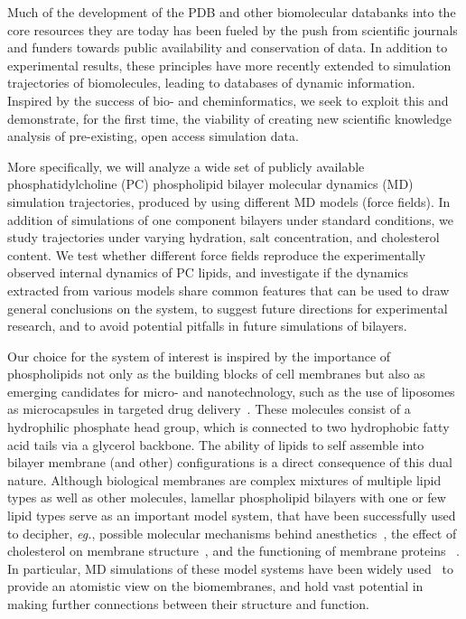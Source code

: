 \documentclass[journal=jpcbfk,manuscript=article,layout=twocolumn]{achemso}
\begin{document}
Much of the development of the PDB and other biomolecular databanks into the core resources they are today has been fueled by the push from scientific journals and funders towards public availability and conservation of data. In addition to experimental results, these principles have more recently extended to simulation trajectories of biomolecules, leading to databases of dynamic information. Inspired by the success of bio- and cheminformatics, we seek to exploit this and demonstrate, for the first time, the viability of creating new scientific knowledge analysis of pre-existing, open access simulation data. 

More specifically, we will analyze a wide set of publicly available phosphatidylcholine (PC) phospholipid bilayer molecular dynamics (MD) simulation trajectories, produced by using different MD models (force fields). In addition of simulations of one component bilayers under standard conditions, we study trajectories under varying hydration, salt concentration, and cholesterol content. We test whether different force fields reproduce the experimentally observed internal dynamics of PC lipids, and investigate if the dynamics extracted from various models share common features that can be used to draw general conclusions on the system, to suggest future directions for experimental research, and to avoid potential pitfalls in future simulations of bilayers.    

Our choice for the system of interest is inspired by the importance of phospholipids not only as the building blocks of cell membranes but also as emerging candidates for micro- and nanotechnology, such as the use of liposomes as microcapsules in targeted drug delivery~\cite{sercombe15}. These molecules consist of a hydrophilic phosphate head group, which is connected to two hydrophobic fatty acid tails via a glycerol backbone. The ability of lipids to self assemble into bilayer membrane (and other) configurations is a direct consequence of this dual nature. Although biological membranes are complex mixtures of multiple lipid types as well as other molecules, lamellar phospholipid bilayers with one or few lipid types serve as an important model system, that have been successfully used to decipher,  \textit{eg.},  possible molecular mechanisms behind anesthetics~\cite{chau07,XXX}, the effect of cholesterol on membrane structure~\cite{XXX,ferreira13}, and the functioning of membrane proteins~\cite{lindahl08} . In particular, MD simulations of these model systems have been widely used~\cite{lyubartsev11,chau07,ferreira13,botan15, ferreira15,miettinen19,XXX} to provide an atomistic view on the biomembranes, and hold vast potential in making further connections between their structure and function.
\end{document}
